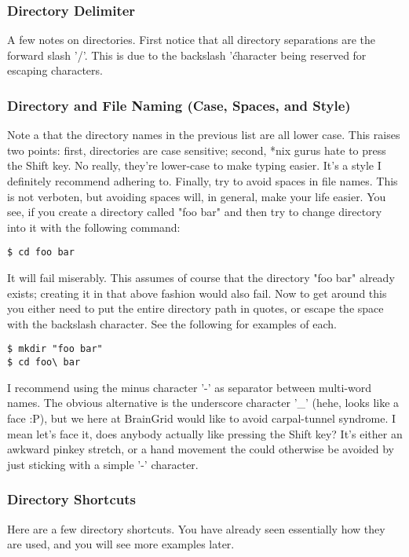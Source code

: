 \subsubsection{Directory Delimiter} \mdseries
A few notes on directories.  First notice that all directory separations are the forward slash '/'.  This is due to the backslash '\' character being reserved for escaping characters.  

\subsubsection{Directory and File Naming (Case, Spaces, and Style)} \mdseries
Note a that the directory names in the previous list are all lower case.  This raises two points: first, directories are case sensitive; second, *nix gurus hate to press the Shift key.  No really, they're lower-case to make typing easier.  It's a style I definitely recommend adhering to.  Finally, try to avoid spaces in file names.  This is not verboten, but avoiding spaces will, in general, make your life easier.  You see, if you create a directory called "foo bar" and then try to change directory into it with the following command:

\begin{lstlisting}
$ cd foo bar
\end{lstlisting}

It will fail miserably.  This assumes of course that the directory "foo bar" already exists; creating it in that above fashion would also fail.  Now to get around this you either need to put the entire directory path in quotes, or escape the space with the backslash character.  See the following for examples of each.

\begin{lstlisting}
$ mkdir "foo bar"
$ cd foo\ bar
\end{lstlisting}

I recommend using the minus character '-' as separator between multi-word names.  The obvious alternative is the underscore character '\_' (hehe, looks like a face :P), but we here at BrainGrid would like to avoid carpal-tunnel syndrome.  I mean let's face it, does anybody actually like pressing the Shift key?  It's either an awkward pinkey stretch, or a hand movement the could otherwise be avoided by just sticking with a simple '-' character.  


\subsubsection{Directory Shortcuts} \mdseries
Here are a few directory shortcuts.  You have already seen essentially how they are used, and you will see more examples later.

